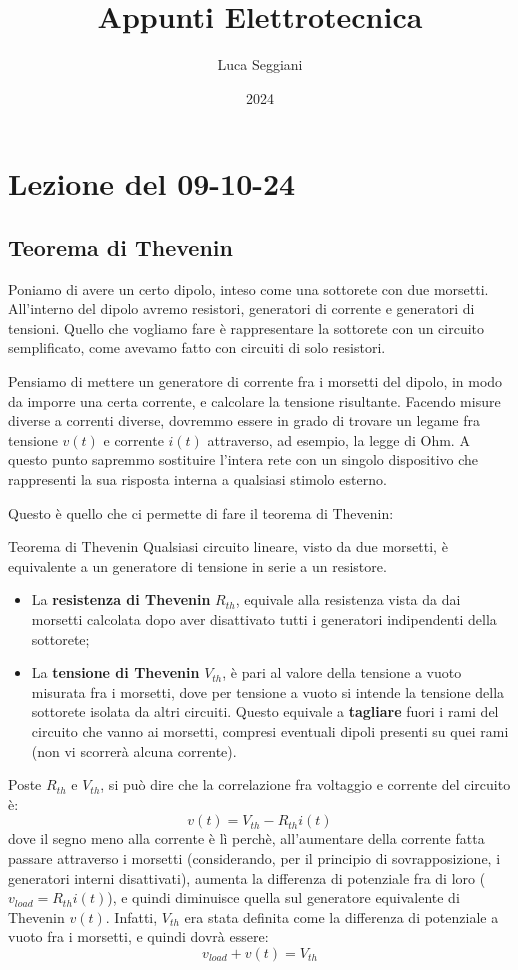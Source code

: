 \documentclass[a4paper,11pt]{article}
\title{Appunti Elettrotecnica}
\author{Luca Seggiani}
\date{2024}
\begin{document}
\section{Lezione del 09-10-24}

\thispagestyle{empty}
\pagestyle{fancy}

\subsection{Teorema di Thevenin}
Poniamo di avere un certo dipolo, inteso come una sottorete con due morsetti.
All'interno del dipolo avremo resistori, generatori di corrente e generatori di tensioni.
Quello che vogliamo fare è rappresentare la sottorete con un circuito semplificato, come avevamo fatto con circuiti di solo resistori.

Pensiamo di mettere un generatore di corrente fra i morsetti del dipolo, in modo da imporre una certa corrente, e calcolare la tensione risultante.
Facendo misure diverse a correnti diverse, dovremmo essere in grado di trovare un legame fra tensione $v(t)$ e corrente $i(t)$ attraverso, ad esempio, la legge di Ohm.
A questo punto sapremmo sostituire l'intera rete con un singolo dispositivo che rappresenti la sua risposta interna a qualsiasi stimolo esterno.

Questo è quello che ci permette di fare il teorema di Thevenin:
\begin{theorem}{Teorema di Thevenin}
	Qualsiasi circuito lineare, visto da due morsetti, è equivalente a un generatore di tensione in serie a un resistore.

\begin{itemize}
	\item La \textbf{resistenza di Thevenin} $R_{th}$, equivale alla resistenza vista da dai morsetti calcolata dopo aver disattivato tutti i generatori indipendenti della sottorete;
	\item La \textbf{tensione di Thevenin} $V_{th}$, è pari al valore della tensione a vuoto misurata fra i morsetti, dove per tensione a vuoto si intende la tensione della sottorete isolata da altri circuiti. Questo equivale a \textbf{tagliare} fuori i rami del circuito che vanno ai morsetti, compresi eventuali dipoli presenti su quei rami (non vi scorrerà alcuna corrente).
\end{itemize}
\end{theorem}

Poste $R_{th}$ e $V_{th}$, si può dire che la correlazione fra voltaggio e corrente del circuito è:
$$
v(t) = V_{th} - R_{th} i(t)
$$
dove il segno meno alla corrente è lì perchè, all'aumentare della corrente fatta passare attraverso i morsetti (considerando, per il principio di sovrapposizione, i generatori interni disattivati), aumenta la differenza di potenziale fra di loro ($v_{load} = R_{th} i(t)$), e quindi diminuisce quella sul generatore equivalente di Thevenin $v(t)$.
Infatti, $V_{th}$ era stata definita come la differenza di potenziale a vuoto fra i morsetti, e quindi dovrà essere:
$$
v_{load} + v(t) = V_{th}
$$
\end{document}
